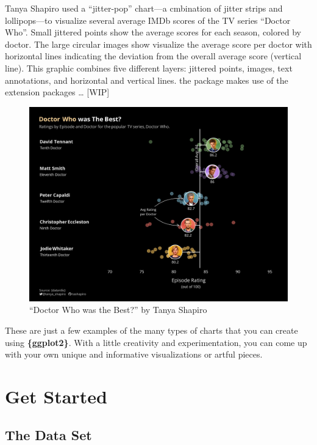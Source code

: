 \documentclass[
]{krantz}
\begin{document}
Tanya Shapiro used a ``jitter-pop'' chart---a cmbination of jitter strips and lollipops---to visualize several average IMDb scores of the TV series ``Doctor Who''. Small jittered points show the average scores for each season, colored by doctor. The large circular images show visualize the average score per doctor with horizontal lines indicating the deviation from the overall average score (vertical line). This graphic combines five different layers: jittered points, images, text annotations, and horizontal and vertical lines. the package makes use of the extension packages \ldots{} {[}WIP{]}

\begin{figure}
\centering
\includegraphics{./img/doctor-who-tanya-shapiro.png}
\caption{\label{fig:02imgVizDoctorWho}``Doctor Who was the Best?'' by Tanya Shapiro}
\end{figure}

These are just a few examples of the many types of charts that you can create using \textbf{\{ggplot2\}}. With a little creativity and experimentation, you can come up with your own unique and informative visualizations or artful pieces.

\hypertarget{get-started}{%
\chapter{Get Started}\label{get-started}}

\hypertarget{dataset}{%
\section{The Data Set}\label{dataset}}
\end{document}
